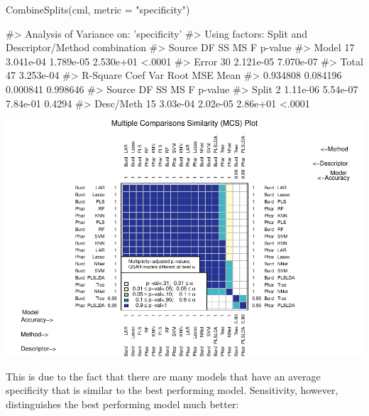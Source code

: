 \begin{Schunk}
\begin{Sinput}
CombineSplits(cml, metric = "specificity")
\end{Sinput}
\begin{Soutput}
#>    Analysis of Variance on: 'specificity'
#>  Using factors: Split and Descriptor/Method combination
#> Source    DF          SS          MS           F   p-value   
#> Model     17   3.041e-04   1.789e-05   2.530e+01    <.0001   
#> Error     30   2.121e-05   7.070e-07   
#> Total     47   3.253e-04   
#>       R-Square   Coef Var   Root MSE       Mean   
#>       0.934808   0.084196   0.000841   0.998646   
#> Source       DF         SS         MS          F   p-value   
#> Split         2   1.11e-06   5.54e-07   7.84e-01    0.4294   
#> Desc/Meth    15   3.03e-04   2.02e-05   2.86e+01    <.0001
\end{Soutput}

\includegraphics{chemmodlabRJournal_files/figure-latex/CombineSplits_sp-1} \end{Schunk}

This is due to the fact that there are many models that have an average
specificity that is similar to the best performing model. Sensitivity,
however, distinguishes the best performing model much better:

